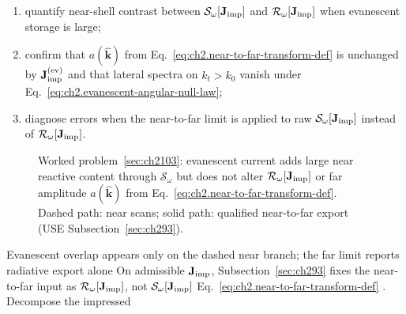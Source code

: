 \begin{enumerate}
\item[(a)] quantify near-shell contrast between \(\mathcal{S}_\omega[\mathbf{J}_{\mathrm{imp}}]\) and
\(\mathcal{R}_\omega[\mathbf{J}_{\mathrm{imp}}]\) when evanescent storage is large;
\item[(b)] confirm that \(a(\widehat{\mathbf{k}})\) from Eq.~\eqref{eq:ch2.near-to-far-transform-def}
is unchanged by \(\mathbf{J}_{\mathrm{imp}}^{(\mathrm{ev})}\) and that lateral spectra on \(k_t>k_0\) vanish under
Eq.~\eqref{eq:ch2.evanescent-angular-null-law};
\item[(c)] diagnose errors when the near-to-far limit is applied to raw
\(\mathcal{S}_\omega[\mathbf{J}_{\mathrm{imp}}]\) instead of \(\mathcal{R}_\omega[\mathbf{J}_{\mathrm{imp}}]\).
\end{enumerate} \begin{figure}[t]
\centering
{}
\caption{Worked problem~\ref{sec:ch2103}: evanescent current adds large near reactive content
through \(\mathcal{S}_\omega\) but does not alter \(\mathcal{R}_\omega[\mathbf{J}_{\mathrm{imp}}]\) or far amplitude
\(a(\widehat{\mathbf{k}})\) from Eq.~\eqref{eq:ch2.near-to-far-transform-def}. Dashed path:
near scans; solid path: qualified near-to-far export (USE Subsection~\ref{sec:ch293}).}
\label{fig:ch2.wp-evanescent-far-suppression}
\end{figure}
Evanescent overlap appears only on
the dashed near branch; the far limit reports radiative export alone
On admissible \(\mathbf{J}_{\mathrm{imp}}\), Subsection~\ref{sec:ch293} fixes the near-to-far input as
\(\mathcal{R}_\omega[\mathbf{J}_{\mathrm{imp}}]\), not \(\mathcal{S}_\omega[\mathbf{J}_{\mathrm{imp}}]\)
Eq.~\eqref{eq:ch2.near-to-far-transform-def} \cite{stratton1941}. Decompose the impressed
